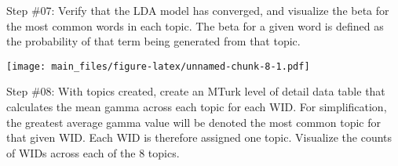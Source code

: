 \documentclass[]{article}
\newenvironment{Shaded}{\begin{snugshade}}{\end{snugshade}}
\newcommand{\KeywordTok}[1]{\textcolor[rgb]{0.13,0.29,0.53}{\textbf{#1}}}
\newcommand{\DataTypeTok}[1]{\textcolor[rgb]{0.13,0.29,0.53}{#1}}
\newcommand{\DecValTok}[1]{\textcolor[rgb]{0.00,0.00,0.81}{#1}}
\newcommand{\StringTok}[1]{\textcolor[rgb]{0.31,0.60,0.02}{#1}}
\newcommand{\CommentTok}[1]{\textcolor[rgb]{0.56,0.35,0.01}{\textit{#1}}}
\newcommand{\OtherTok}[1]{\textcolor[rgb]{0.56,0.35,0.01}{#1}}
\newcommand{\OperatorTok}[1]{\textcolor[rgb]{0.81,0.36,0.00}{\textbf{#1}}}
\newcommand{\NormalTok}[1]{#1}
\begin{document}
Step \#07: Verify that the LDA model has converged, and visualize the
beta for the most common words in each topic. The beta for a given word
is defined as the probability of that term being generated from that
topic.

\begin{Shaded}
\end{Shaded}

\texttt{[image: main\_files/figure-latex/unnamed-chunk-8-1.pdf]}

Step \#08: With topics created, create an MTurk level of detail data
table that calculates the mean gamma across each topic for each WID. For
simplification, the greatest average gamma value will be denoted the
most common topic for that given WID. Each WID is therefore assigned one
topic. Visualize the counts of WIDs across each of the 8 topics.
\end{document}
